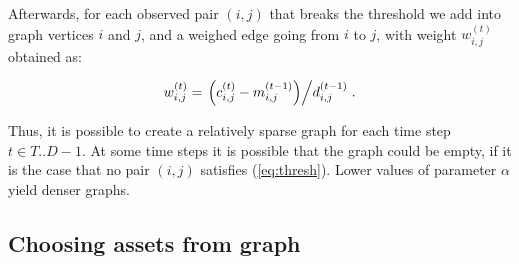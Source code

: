 \documentclass[letterpaper, 10 pt, conference]{ieeeconf}
\begin{document}
  Afterwards, for each observed pair $(i,j)$ that breaks the threshold we add into graph vertices $i$ and $j$, and a weighed edge going from $i$ to $j$, with weight $w_{i,j}^{(t)}$ obtained as:
  
  \begin{equation}
    \label{eq:weight}
    w_{i,j}^{(t)} = \left. \left(c_{i,j}^{(t)} - m_{i,j}^{(t-1)}\right) \middle/ d_{i,j}^{(t-1)} \right..
  \end{equation}
  
  Thus, it is possible to create a relatively sparse graph for each time step $t \in T..D-1$.
  At some time steps it is possible that the graph could be empty, if it is the case that no pair $(i,j)$ satisfies (\ref{eq:thresh}).
  Lower values of parameter $\alpha$ yield denser graphs.
  
  \subsection{Choosing assets from graph}
  
\end{document}
